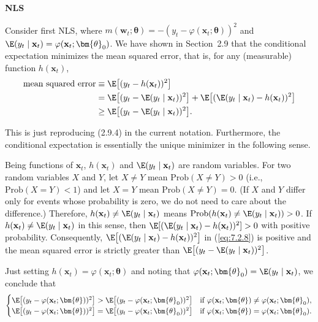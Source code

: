 \medskip
\noindent\textbf{NLS}

\medskip
Consider first NLS, where $m(\mathbf{w}_t; \bm{\theta}) = -(y_t - \varphi(\mathbf{x}_t; \bm{\theta}))^2$ and $\E(y_t \mid \mathbf{x}_t) = \varphi(\mathbf{x}_t; \bm{\theta}_0)$. We have shown in Section~2.9 that the conditional expectation minimizes the mean squared error, that is, for any (measurable) function $h(\mathbf{x}_t)$,
\begin{equation}
\label{eq:7.2.8}
\begin{split}
\text{mean squared error} &\equiv \E\bigl[(y_t - h(\mathbf{x}_t))^2\bigr] \\
&= \E\bigl[(y_t - \E(y_t \mid \mathbf{x}_t))^2\bigr] + \E\bigl[(\E(y_t \mid \mathbf{x}_t) - h(\mathbf{x}_t))^2\bigr] \\
&\geq \E\bigl[(y_t - \E(y_t \mid \mathbf{x}_t))^2\bigr].
\end{split}
\end{equation}

This is just reproducing (2.9.4) in the current notation. Furthermore, the conditional expectation is essentially the unique minimizer in the following sense.

Being functions of $\mathbf{x}_t$, $h(\mathbf{x}_t)$ and $\E(y_t \mid \mathbf{x}_t)$ are random variables. For two random variables $X$ and $Y$, let $X \neq Y$ mean $\text{Prob}(X \neq Y) > 0$ (i.e., $\text{Prob}(X = Y) < 1$) and let $X = Y$ mean $\text{Prob}(X \neq Y) = 0$. (If $X$ and $Y$ differ only for events whose probability is zero, we do not need to care about the difference.) Therefore, $h(\mathbf{x}_t) \neq \E(y_t \mid \mathbf{x}_t)$ means $\text{Prob}(h(\mathbf{x}_t) \neq \E(y_t \mid \mathbf{x}_t)) > 0$. If $h(\mathbf{x}_t) \neq \E(y_t \mid \mathbf{x}_t)$ in this sense, then $\E[(\E(y_t \mid \mathbf{x}_t) - h(\mathbf{x}_t))^2] > 0$ with positive probability. Consequently, $\E\bigl[(\E(y_t \mid \mathbf{x}_t) - h(\mathbf{x}_t))^2\bigr]$ in (\ref{eq:7.2.8}) is positive and the mean squared error is strictly greater than $\E\bigl[(y_t - \E(y_t \mid \mathbf{x}_t))^2\bigr]$.

Just setting $h(\mathbf{x}_t) = \varphi(\mathbf{x}_t; \bm{\theta})$ and noting that $\varphi(\mathbf{x}_t; \bm{\theta}_0) = \E(y_t \mid \mathbf{x}_t)$, we conclude that
\begin{equation}
\label{eq:7.2.9}
\begin{cases}
\E\bigl[(y_t - \varphi(\mathbf{x}_t; \bm{\theta}))^2\bigr] > \E\bigl[(y_t - \varphi(\mathbf{x}_t; \bm{\theta}_0))^2\bigr] & \text{if } \varphi(\mathbf{x}_t; \bm{\theta}) \neq \varphi(\mathbf{x}_t; \bm{\theta}_0), \\
\E\bigl[(y_t - \varphi(\mathbf{x}_t; \bm{\theta}))^2\bigr] = \E\bigl[(y_t - \varphi(\mathbf{x}_t; \bm{\theta}_0))^2\bigr] & \text{if } \varphi(\mathbf{x}_t; \bm{\theta}) = \varphi(\mathbf{x}_t; \bm{\theta}_0).
\end{cases}
\end{equation}

